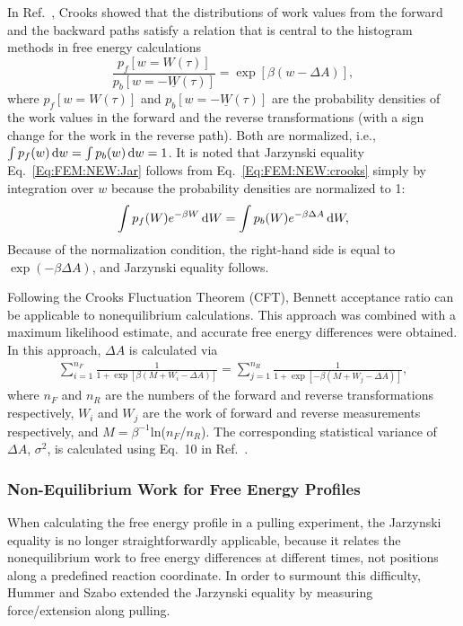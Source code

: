 In Ref.~\cite{CrooksJSP1998}, Crooks showed that the distributions of work values from the forward and the backward paths satisfy a relation that is central to the histogram methods in free energy calculations
\begin{equation}
\frac{p_{f}[w=W(\tau)]}{p_{b}[w=-\underline{W}(\tau)]}=\exp[\beta(w-\Delta A)],
\label{Eq:FEM:NEW:crooks}
\end{equation}
where $p_{f}[w=W(\tau)]$ and $p_{b}[w=-\underline{W}(\tau)]$ are the probability densities of the work values in the forward and the reverse transformations (with a sign change for the work in the reverse path). Both are normalized, i.e., $\int p_{f}(w) \mathop{}\!\mathrm{d} w=\int p_{b}(w) \mathop{}\!\mathrm{d} w=1$. It is noted that Jarzynski equality Eq.~\ref{Eq:FEM:NEW:Jar} follows from Eq.~\ref{Eq:FEM:NEW:crooks} simply by integration over $w$ because the probability densities are normalized to 1:
\begin{equation}
\int p_{f}(W)e^{-\beta W}\mathop{}\!\mathrm{d} W=\int p_{b}(W)e^{-\beta \Delta A}\mathop{}\!\mathrm{d} W,
\label{Eq:FEM:NEW:crookstojar}
\end{equation}
Because of the normalization condition, the right-hand side is equal to $\exp(-\beta \Delta A)$, and Jarzynski equality follows.

Following the Crooks Fluctuation Theorem (CFT),\cite{CrooksJSP1998} Bennett acceptance ratio can be applicable to nonequilibrium calculations. This approach was combined with a maximum likelihood estimate, and accurate free energy differences were obtained.\cite{ShirtsPRL2003}
In this approach, $\Delta A$ is calculated via
\begin{align}
\sum_{i=1}^{n_{F}}\frac{1}{1+\exp \left[\beta(M+W_{i}-\Delta A)\right]} = \sum_{j=1}^{n_{R}}\frac{1}{1+\exp \left[-\beta(M+W_{j}-\Delta A)\right]},
\label{Eq:FEM:NEW:NEBAR}
\end{align}
where $n_{F}$ and $n_{R}$ are the numbers of the forward and reverse transformations respectively, $W_{i}$ and $W_{j}$ are the work of forward and reverse measurements respectively, and $M=\beta^{-1}$ln($n_{F}$/$n_{R}$).
The corresponding statistical variance of $ \Delta A $, $ \sigma^2 $, is calculated using Eq.~10 in Ref.~\cite{ShirtsPRL2003}.

\subsubsection{Non-Equilibrium Work for Free Energy Profiles\label{Sec:FEM:NEW:FEP}}
When calculating the free energy profile in a pulling experiment, the Jarzynski equality is no longer straightforwardly applicable, because it relates the nonequilibrium work to free energy differences at different times, not positions along a predefined reaction coordinate. In order to surmount this difficulty, Hummer and Szabo extended the Jarzynski equality by measuring force/extension along pulling.\cite{HummerPNAS2001}

